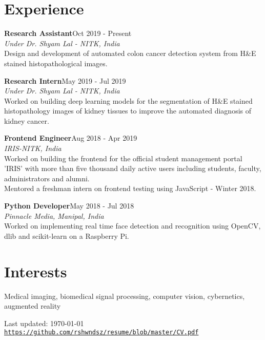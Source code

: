 \documentclass[letterpaper]{article}
\def\footerlink{https://github.com/rshwndsz/resume/blob/master/CV.pdf}
\renewenvironment{itemize}{
  \begin{list}{}{
    \setlength{\leftmargin}{1.5em}
  }
}{
  \end{list}
}
\begin{document}
\section*{Experience}
  \begin{itemize}
    \item \textbf{Research Assistant}\hfill{Oct 2019 - Present}\\
    \textit{Under Dr. Shyam Lal - NITK, India}\\
    Design and development of automated colon cancer detection system from H\&E stained histopathological images.

    \item \textbf{Research Intern}\hfill{May 2019 - Jul 2019}\\
    \textit{Under Dr. Shyam Lal - NITK, India}\\
    Worked on building deep learning models for the segmentation of H\&E stained histopathology images of kidney tissues to improve the automated diagnosis of kidney cancer.

    \item \textbf{Frontend Engineer}\hfill{Aug 2018 - Apr 2019}\\
    \textit{IRIS-NITK, India}\\
    Worked on building the frontend for the official student management portal 'IRIS' with more than five thousand daily active users including students, faculty, administrators and alumni.\\
    Mentored a freshman intern on frontend testing using JavaScript - Winter 2018.

    \item \textbf{Python Developer}\hfill{May 2018 - Jul 2018}\\
    \textit{Pinnacle Media, Manipal, India}\\
    Worked on implementing real time face detection and recognition using OpenCV, dlib and scikit-learn on a Raspberry Pi.
  \end{itemize}

\section*{Interests}
  \begin{itemize}
    \item Medical imaging, biomedical signal processing, computer vision, cybernetics, augmented reality
  \end{itemize}

\bigskip

\begin{center}
  \begin{footnotesize}
    Last updated: \today \\
    \href{\footerlink}{\texttt{\footerlink}}
  \end{footnotesize}
\end{center}
\end{document}
